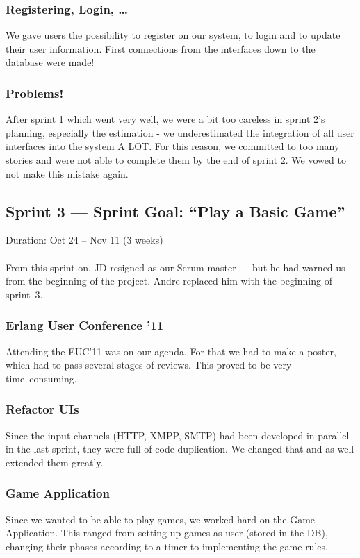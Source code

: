 \documentclass[11pt,a4paper]{report}
\begin{document}
\subsubsection{Registering, Login, \ldots}
We gave users the possibility to register on our system, to login and to update
their user information. First connections from the interfaces down to the
database were made!

\subsubsection{Problems!}
After sprint 1 which went very well, we were a bit too careless in sprint 2's
planning, especially the estimation - we underestimated the integration of
all user interfaces into the system A LOT.
For this reason, we committed to too many stories and were not able to complete
them by the end of sprint 2. We vowed to not make this mistake again.

\subsection*{Sprint 3 --- Sprint Goal: ``Play a Basic Game''}
Duration: Oct 24 -- Nov 11 (3 weeks)\\\\
From this sprint on, JD resigned as our Scrum master --- but he had warned us
from the beginning of the project. Andre replaced him with the beginning of
sprint~3.

\subsubsection{Erlang User Conference '11}

Attending the EUC'11 was on our agenda. For that we had to make a
poster, which had to pass several stages of reviews. This proved to be very
time~consuming.
\subsubsection{Refactor UIs}
Since the input channels (HTTP, XMPP, SMTP) had been developed in parallel in
the last sprint, they were full of code duplication. We changed that and as well
extended them greatly.
\subsubsection{Game Application}
Since we wanted to be able to play games, we worked hard on the Game
Application. This ranged from setting up games as user (stored in the DB),
changing their phases according to a timer to implementing the game rules.
\end{document}
